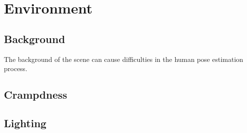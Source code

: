 \section{Environment}

\subsection{Background}

The background of the scene can cause difficulties in the human pose estimation process.

\subsection{Crampdness}

\subsection{Lighting}

